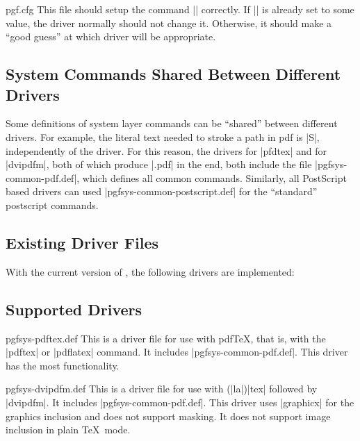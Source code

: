 \begin{filedescription}{pgf.cfg}
  This file should setup the command |\pgfsysdriver| correctly. If
  |\pgfsysdriver| is already set to some value, the driver normally
  should not change it. Otherwise, it should make a ``good guess'' at
  which driver will be appropriate.
\end{filedescription}



\subsection{System Commands Shared Between Different Drivers}

Some definitions of system layer commands can be ``shared'' between
different drivers. For example, the literal text needed to stroke a
path in pdf is |S|, independently of the driver. For this reason,
the drivers for |pfdtex| and for |dvipdfm|, both of which produce
|.pdf| in the end, both include the file |pgfsys-common-pdf.def|,
which defines all common commands. Similarly, all PostScript based
drivers can used |pgfsys-common-postscript.def| for the ``standard''
postscript commands.


\subsection{Existing Driver Files}

With the current version of \pgfname, the following drivers are
implemented:

\subsection{Supported Drivers}

\begin{filedescription}{pgfsys-pdftex.def}
  This is a driver file for use with pdf\TeX, that is, with the
  |pdftex| or |pdflatex| command. It includes
  |pgfsys-common-pdf.def|. This driver has the most functionality. 
\end{filedescription}

\begin{filedescription}{pgfsys-dvipdfm.def}
  This is a driver file for use with (|la|)|tex| followed by |dvipdfm|. It
  includes |pgfsys-common-pdf.def|. This driver uses |graphicx| for the
  graphics inclusion and does not support masking. It does not
  support image inclusion in plain \TeX\ mode.
\end{filedescription}

